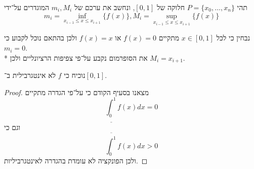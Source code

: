 \Subquestion{}
תהי $P = \{x_0, \dots, x_n\}$ חלוקה של $[0, 1]$, ונחשב את ערכם של $m_i, M_i$ המוגדרים על־ידי
\[
	m_i = \inf_{x_{i - 1} \le x \le x_{i + 1}} \{ f(x) \},
	M_i = \sup_{x_{i - 1} \le x \le x_{i + 1}} \{ f(x) \}
\]

נבחין כי לכל $x \in [0, 1]$ מתקיים $f(x) = 0$ או $f(x) = x$ ולכן בהתאם נוכל לקבוע כי $m_i = 0$. \\*
את הסופרמום נקבע על־פי צפיפות הרציונליים ולכן $M_i = x_{i + 1}$.

\Subquestion{}
נוכיח כי $f$ לא אינטגרבילית ב־$[0, 1]$.
\begin{proof}
	מצאנו בסעיף הקודם כי על־פי הגדרה מתקיים
	\[
		\underline{\int_0^1} f(x) dx = 0
	\]
	וגם כי
	\[
		\overline{\int_0^1} f(x) dx > 0
	\]
	ולכן הפונקציה לא עומדת בהגדרה לאינטגרביליות.
\end{proof}


